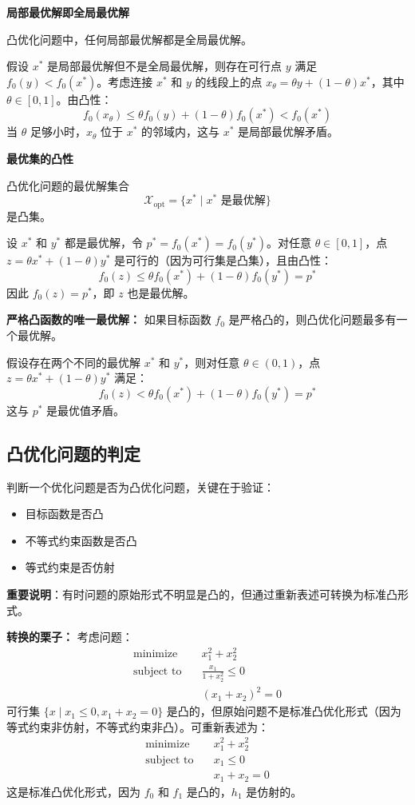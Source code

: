 \documentclass[12pt,a4paper]{book}
\begin{document}
\textbf{局部最优解即全局最优解}

凸优化问题中，任何局部最优解都是全局最优解。

假设 $x^*$ 是局部最优解但不是全局最优解，则存在可行点 $y$ 满足 $f_0(y) < f_0(x^*)$。考虑连接 $x^*$ 和 $y$ 的线段上的点 $x_\theta = \theta y + (1-\theta)x^*$，其中 $\theta \in [0,1]$。由凸性：
\[
f_0(x_\theta) \leq \theta f_0(y) + (1-\theta)f_0(x^*) < f_0(x^*)
\]
当 $\theta$ 足够小时，$x_\theta$ 位于 $x^*$ 的邻域内，这与 $x^*$ 是局部最优解矛盾。

\textbf{最优集的凸性}

凸优化问题的最优解集合 
\[
\mathcal{X}_{\text{opt}} = \{x^* \mid x^* \text{ 是最优解}\}
\]
是凸集。

设 $x^*$ 和 $y^*$ 都是最优解，令 $p^* = f_0(x^*) = f_0(y^*)$。对任意 $\theta \in [0,1]$，点 $z = \theta x^* + (1-\theta)y^*$ 是可行的（因为可行集是凸集），且由凸性：
\[
f_0(z) \leq \theta f_0(x^*) + (1-\theta)f_0(y^*) = p^*
\]
因此 $f_0(z) = p^*$，即 $z$ 也是最优解。

\textbf{严格凸函数的唯一最优解：}
如果目标函数 $f_0$ 是严格凸的，则凸优化问题最多有一个最优解。

假设存在两个不同的最优解 $x^*$ 和 $y^*$，则对任意 $\theta \in (0,1)$，点 $z = \theta x^* + (1-\theta)y^*$ 满足：
\[
f_0(z) < \theta f_0(x^*) + (1-\theta)f_0(y^*) = p^*
\]
这与 $p^*$ 是最优值矛盾。

\subsection{凸优化问题的判定}

判断一个优化问题是否为凸优化问题，关键在于验证：
\begin{itemize}
    \item 目标函数是否凸
    \item 不等式约束函数是否凸
    \item 等式约束是否仿射
\end{itemize}

\textbf{重要说明}：有时问题的原始形式不明显是凸的，但通过重新表述可转换为标准凸形式。

\textbf{转换的栗子：}
考虑问题：
\[
\begin{aligned}
\text{minimize} \quad & x_1^2 + x_2^2 \\
\text{subject to} \quad & \frac{x_1}{1+x_2^2} \leq 0 \\
& (x_1+x_2)^2 = 0
\end{aligned}
\]
可行集 $\{x \mid x_1 \leq 0, x_1+x_2 = 0\}$ 是凸的，但原始问题不是标准凸优化形式（因为等式约束非仿射，不等式约束非凸）。可重新表述为：
\[
\begin{aligned}
\text{minimize} \quad & x_1^2 + x_2^2 \\
\text{subject to} \quad & x_1 \leq 0 \\
& x_1 + x_2 = 0
\end{aligned}
\]
这是标准凸优化形式，因为 $f_0$ 和 $f_1$ 是凸的，$h_1$ 是仿射的。
\end{document}
